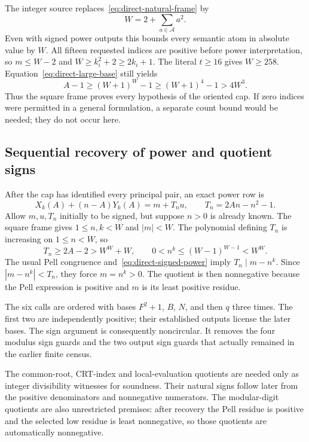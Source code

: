 The integer source replaces~\eqref{eq:direct-natural-frame} by
\begin{equation}
 W=2+\sum_{a\in\mathcal A}a^2.
 \label{eq:direct-square-frame}
\end{equation}
Even with signed power outputs this bounds every semantic atom in
absolute value by $W$. All fifteen requested indices are positive
before power interpretation, so $m\le W-2$ and
$W\ge k_i^2+2\ge2k_i+1$. The literal $t\ge16$ gives $W\ge258$.
Equation~\eqref{eq:direct-large-base} still yields
\[
 A-1\ge(W+1)^W-1\ge(W+1)^4-1>4W^3.
\]
Thus the square frame proves every hypothesis of the oriented cap.
If zero indices were permitted in a general formulation, a separate
count bound would be needed; they do not occur here.

\subsection{Sequential recovery of power and quotient signs}

After the cap has identified every principal pair, an exact power row is
\begin{equation}
 X_k(A)+(n-A)Y_k(A)=m+T_nu,
 \qquad T_n=2An-n^2-1.
 \label{eq:direct-signed-power}
\end{equation}
Allow $m,u,T_n$ initially to be signed, but suppose $n>0$ is already
known. The square frame gives $1\le n,k<W$ and $|m|<W$.
The polynomial defining $T_n$ is increasing on $1\le n<W$, so
\[
 T_n\ge2A-2>W^W+W,
 \qquad 0<n^k\le(W-1)^{W-1}<W^W.
\]
The usual Pell congruence and~\eqref{eq:direct-signed-power} imply
$T_n\mid m-n^k$. Since $|m-n^k|<T_n$, they force $m=n^k>0$.
The quotient is then nonnegative because the Pell expression is positive
and $m$ is its least positive residue.

The six calls are ordered with bases $F^2+1$, $B$, $N$, and then $q$
three times. The first two are independently positive; their established
outputs license the later bases. The sign argument is consequently
noncircular. It removes the four modulus sign guards and the two output
sign guards that actually remained in the earlier finite census.

The common-root, CRT-index and local-evaluation quotients are needed
only as integer divisibility witnesses for soundness. Their natural signs
follow later from the positive denominators and nonnegative numerators.
The modular-digit quotients are also unrestricted premises: after
recovery the Pell residue is positive and the selected low residue is
least nonnegative, so those quotients are automatically nonnegative.

